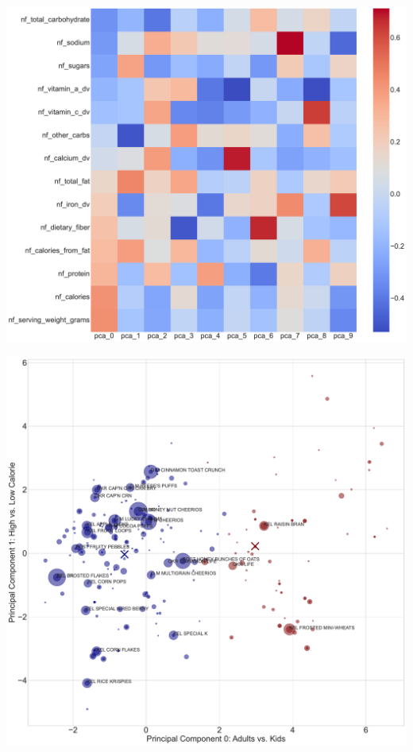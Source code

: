 \begin{frame}[plain]
\begin{center}
\includegraphics[height = \textheight ]{../common ownership/figures/pca_coeff.pdf}
\end{center}
\end{frame}


\begin{frame}[plain]
\begin{center}
\includegraphics[height = \textheight ]{../common ownership/figures/pca_nests.pdf}
\end{center}
\end{frame}



